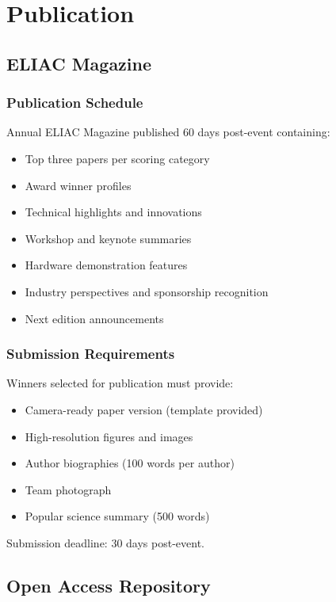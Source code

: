 
\renewcommand{\thesection}{M}
\section{Publication}

\subsection{ELIAC Magazine}

\subsubsection{Publication Schedule}
Annual ELIAC Magazine published 60 days post-event containing:
\begin{itemize}[noitemsep]
    \item Top three papers per scoring category
    \item Award winner profiles
    \item Technical highlights and innovations
    \item Workshop and keynote summaries
    \item Hardware demonstration features
    \item Industry perspectives and sponsorship recognition
    \item Next edition announcements
\end{itemize}

\subsubsection{Submission Requirements}
Winners selected for publication must provide:
\begin{itemize}[noitemsep]
    \item Camera-ready paper version (template provided)
    \item High-resolution figures and images
    \item Author biographies (100 words per author)
    \item Team photograph
    \item Popular science summary (500 words)
\end{itemize}

Submission deadline: 30 days post-event.

\subsection{Open Access Repository}

